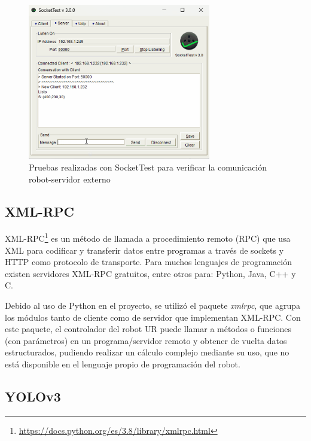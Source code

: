 \begin{figure} [H]
    \begin{center}
      \includegraphics[width=8cm]{figs/pruebas_socket_test.png}
    \end{center}
    \caption{Pruebas realizadas con SocketTest para verificar la comunicación robot-servidor externo}
    \label{fig:socket}
\end{figure}

\subsection{XML-RPC}
\label{sec:XMLRPC}

XML-RPC\footnote{\url{https://docs.python.org/es/3.8/library/xmlrpc.html}} es un método de llamada a procedimiento remoto (RPC) que usa XML para codificar y transferir datos entre programas a través de sockets y HTTP como protocolo de transporte. Para muchos lenguajes de programación existen servidores XML-RPC gratuitos, entre otros para: Python, Java, C++ y C.

Debido al uso de Python en el proyecto, se utilizó el paquete \textit{xmlrpc}, que agrupa los módulos tanto de cliente como de servidor que implementan XML-RPC. Con este paquete, el controlador del robot UR puede llamar a métodos o funciones (con parámetros) en un programa/servidor remoto y obtener de vuelta datos estructurados, pudiendo realizar un cálculo complejo mediante su uso, que no está disponible en el lenguaje propio de programación del robot.

\subsection{YOLOv3}
\label{sec:YOLOv3}

